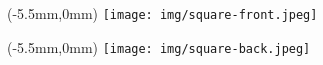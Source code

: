 \documentclass{article}
\begin{document}
  
  \thispagestyle{empty}\null
  \begin{textblock*}{126mm}(-5.5mm,0mm)%
    \texttt{[image: img/square-front.jpeg]}%
  \end{textblock*}
  \newpage
  \thispagestyle{empty}\null\newpage
  
  \thispagestyle{empty}\null\newpage
  \thispagestyle{empty}\null
  \begin{textblock*}{126mm}(-5.5mm,0mm)%
    \texttt{[image: img/square-back.jpeg]}%
  \end{textblock*}
\end{document}
